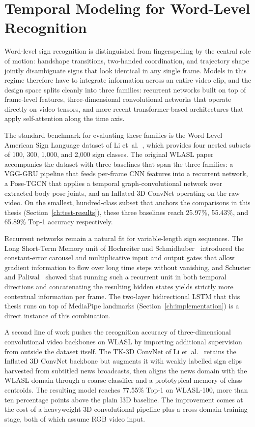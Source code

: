 \section{Temporal Modeling for Word-Level Recognition}
\label{sec:related-temporal}

Word-level sign recognition is distinguished from fingerspelling by the
central role of motion: handshape transitions, two-handed coordination,
and trajectory shape jointly disambiguate signs that look identical in
any single frame. Models in this regime therefore have to integrate
information across an entire video clip, and the design space splits
cleanly into three families: recurrent networks built on top of
frame-level features, three-dimensional convolutional networks that
operate directly on video tensors, and more recent transformer-based
architectures that apply self-attention along the time axis.

The standard benchmark for evaluating these families is the Word-Level
American Sign Language dataset of Li et~al.~\cite{li2020wlasl}, which
provides four nested subsets of 100, 300, 1{,}000, and 2{,}000 sign
classes. The original WLASL paper accompanies the dataset with three
baselines that span the three families: a VGG-GRU pipeline that feeds
per-frame CNN features into a recurrent network, a Pose-TGCN that
applies a temporal graph-convolutional network over extracted body
pose joints, and an Inflated 3D ConvNet operating on the raw video.
On the smallest, hundred-class subset that anchors the comparisons in
this thesis (Section~\ref{ch:test-results}), these three baselines
reach 25.97\%, 55.43\%, and 65.89\% Top-1 accuracy respectively.

Recurrent networks remain a natural fit for variable-length sign
sequences. The Long Short-Term Memory unit of Hochreiter and
Schmidhuber~\cite{hochreiter1997lstm} introduced the constant-error
carousel and multiplicative input and output gates that allow gradient
information to flow over long time steps without vanishing, and
Schuster and Paliwal~\cite{schuster1997bidirectional} showed that
running such a recurrent unit in both temporal directions and
concatenating the resulting hidden states yields strictly more
contextual information per frame. The two-layer bidirectional LSTM
that this thesis runs on top of MediaPipe landmarks
(Section~\ref{ch:implementation}) is a direct instance of this
combination.

A second line of work pushes the recognition accuracy of
three-dimensional convolutional video backbones on WLASL by importing
additional supervision from outside the dataset itself. The TK-3D
ConvNet of Li et~al.~\cite{li2020transferring} retains the Inflated 3D
ConvNet backbone but augments it with weakly labelled sign clips
harvested from subtitled news broadcasts, then aligns the news domain
with the WLASL domain through a coarse classifier and a prototypical
memory of class centroids. The resulting model reaches 77.55\% Top-1
on WLASL-100, more than ten percentage points above the plain I3D
baseline. The improvement comes at the cost of a heavyweight 3D
convolutional pipeline plus a cross-domain training stage, both of
which assume RGB video input.


